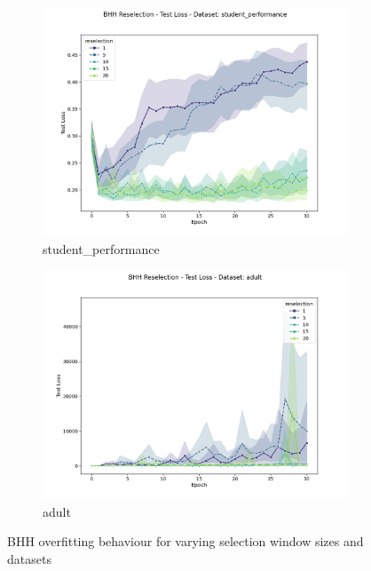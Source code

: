 \begin{figure}[htbp]
	\begin{subfigure}{0.5\textwidth}
    	\centering
        \includegraphics[width=\textwidth]{analysis/bhh_reselection/figures/test/loss/student_performance.png}
        \caption{student\_performance}
        \label{fig:results:overfitting:figures:loss1}
	\end{subfigure}
	\begin{subfigure}{0.5\textwidth}
    	\centering
        \includegraphics[width=\textwidth]{analysis/bhh_reselection/figures/test/loss/adult.png}
        \caption{adult}
        \label{fig:results:overfitting:figures:loss2}
	\end{subfigure}
	\caption{\Acs{BHH} overfitting behaviour for varying selection window sizes and datasets}
	\label{fig:results:overfitting:figures:loss}
\end{figure}

